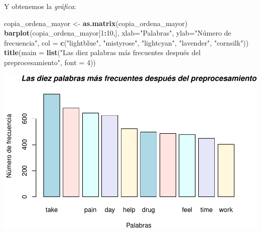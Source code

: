 \documentclass[spanish,]{article}
\newenvironment{Shaded}{\begin{snugshade}}{\end{snugshade}}
\newcommand{\KeywordTok}[1]{\textcolor[rgb]{0.13,0.29,0.53}{\textbf{#1}}}
\newcommand{\DataTypeTok}[1]{\textcolor[rgb]{0.13,0.29,0.53}{#1}}
\newcommand{\DecValTok}[1]{\textcolor[rgb]{0.00,0.00,0.81}{#1}}
\newcommand{\StringTok}[1]{\textcolor[rgb]{0.31,0.60,0.02}{#1}}
\newcommand{\OperatorTok}[1]{\textcolor[rgb]{0.81,0.36,0.00}{\textbf{#1}}}
\newcommand{\NormalTok}[1]{#1}
\begin{document}
Y obtenemos la \emph{gráfica}:

\begin{Shaded}
\begin{Highlighting}[]
\NormalTok{copia_ordena_mayor <-}\StringTok{ }\KeywordTok{as.matrix}\NormalTok{(copia_ordena_mayor)}
\KeywordTok{barplot}\NormalTok{(copia_ordena_mayor[}\DecValTok{1}\OperatorTok{:}\DecValTok{10}\NormalTok{,],  }\DataTypeTok{xlab=}\StringTok{"Palabras"}\NormalTok{, }\DataTypeTok{ylab=}\StringTok{"Número de frecuencia"}\NormalTok{,}
        \DataTypeTok{col =} \KeywordTok{c}\NormalTok{(}\StringTok{"lightblue"}\NormalTok{, }\StringTok{"mistyrose"}\NormalTok{, }\StringTok{"lightcyan"}\NormalTok{,}
                \StringTok{"lavender"}\NormalTok{, }\StringTok{"cornsilk"}\NormalTok{))}
\KeywordTok{title}\NormalTok{(}\DataTypeTok{main =} \KeywordTok{list}\NormalTok{(}\StringTok{"Las diez palabras más frecuentes después del preprocesamiento"}\NormalTok{, }\DataTypeTok{font =} \DecValTok{4}\NormalTok{))}
\end{Highlighting}
\end{Shaded}

\includegraphics{practica_files/figure-latex/unnamed-chunk-38-1.pdf}
\end{document}
